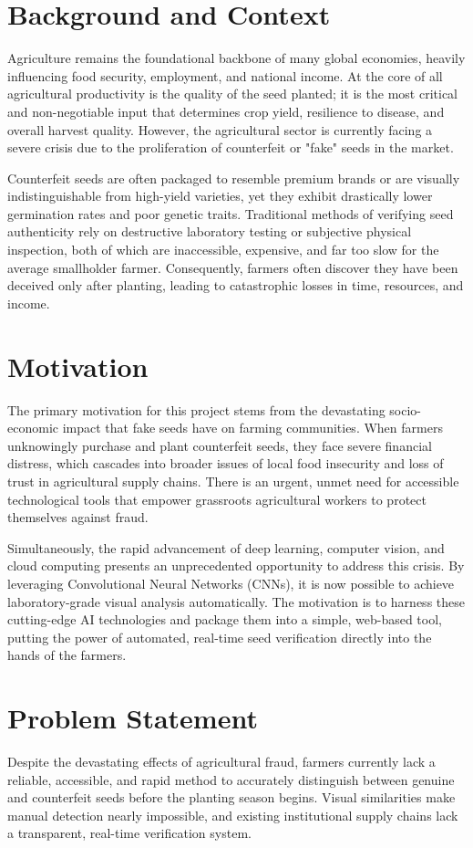 \section{Background and Context}
Agriculture remains the foundational backbone of many global economies, heavily influencing food security, employment, and national income. At the core of all agricultural productivity is the quality of the seed planted; it is the most critical and non-negotiable input that determines crop yield, resilience to disease, and overall harvest quality. However, the agricultural sector is currently facing a severe crisis due to the proliferation of counterfeit or "fake" seeds in the market.

Counterfeit seeds are often packaged to resemble premium brands or are visually indistinguishable from high-yield varieties, yet they exhibit drastically lower germination rates and poor genetic traits. Traditional methods of verifying seed authenticity rely on destructive laboratory testing or subjective physical inspection, both of which are inaccessible, expensive, and far too slow for the average smallholder farmer. Consequently, farmers often discover they have been deceived only after planting, leading to catastrophic losses in time, resources, and income.

\section{Motivation}
The primary motivation for this project stems from the devastating socio-economic impact that fake seeds have on farming communities. When farmers unknowingly purchase and plant counterfeit seeds, they face severe financial distress, which cascades into broader issues of local food insecurity and loss of trust in agricultural supply chains. There is an urgent, unmet need for accessible technological tools that empower grassroots agricultural workers to protect themselves against fraud.

Simultaneously, the rapid advancement of deep learning, computer vision, and cloud computing presents an unprecedented opportunity to address this crisis. By leveraging Convolutional Neural Networks (CNNs), it is now possible to achieve laboratory-grade visual analysis automatically. The motivation is to harness these cutting-edge AI technologies and package them into a simple, web-based tool, putting the power of automated, real-time seed verification directly into the hands of the farmers.

\section{Problem Statement}
Despite the devastating effects of agricultural fraud, farmers currently lack a reliable, accessible, and rapid method to accurately distinguish between genuine and counterfeit seeds before the planting season begins. Visual similarities make manual detection nearly impossible, and existing institutional supply chains lack a transparent, real-time verification system.

